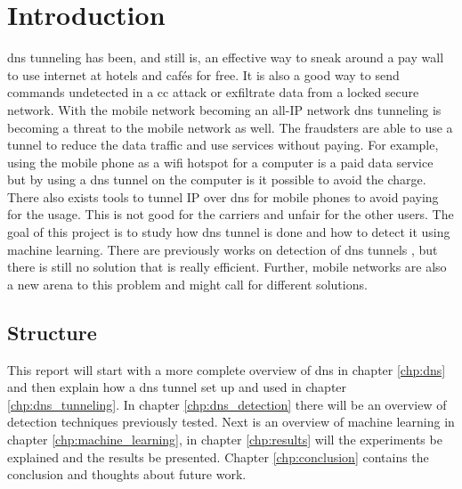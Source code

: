 \chapter{Introduction}
\label{chp:intro}

\gls{dns} tunneling has been, and still is, an effective way to sneak around a pay wall to use internet at hotels and cafés for free. It is also a good way to send commands undetected in a \gls{cc} attack or exfiltrate data from a locked secure network. With the mobile network becoming an all-IP network \gls{dns} tunneling is becoming a threat to the mobile network as well. The fraudsters are able to use a tunnel to reduce the data traffic and use services without paying. For example, using the mobile phone as a wifi hotspot for a computer is a paid data service but by using a \gls{dns} tunnel on the computer is it possible to avoid the charge. There also exists tools to tunnel IP over \gls{dns} for mobile phones to avoid paying for the usage. This is not good for the carriers and unfair for the other users. The goal of this project is to study how \gls{dns} tunnel is done and how to detect it using machine learning. There are previously works on detection of \gls{dns} tunnels \cite{farnham2013detecting}, but there is still no solution that is really efficient. Further, mobile networks are also a new arena to this problem and might call for different solutions.



\section{Structure}
This report will start with a more complete overview of \gls{dns} in chapter \ref{chp:dns} and then explain how a \gls{dns} tunnel set up and used in chapter \ref{chp:dns_tunneling}. In chapter \ref{chp:dns_detection} there will be an overview of detection techniques previously tested. Next is an overview of machine learning in chapter \ref{chp:machine_learning}, in chapter \ref{chp:results} will the experiments be explained and the results be presented. Chapter \ref{chp:conclusion} contains the conclusion and thoughts about future work. 